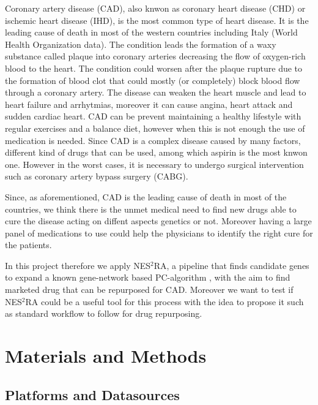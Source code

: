 \documentclass[fleqn,10pt]{SelfArx} %
\begin{document}
Coronary artery disease (CAD), also knwon as coronary heart disease (CHD) or ischemic heart disease (IHD), is the most common type of heart disease. It is the leading cause of death in most of the western countries including Italy (World Health Organization data). The condition leads the formation of a waxy substance called plaque into coronary arteries decreasing the flow of oxygen-rich blood to the heart. The condition could worsen after the plaque rupture due to the formation of blood clot that could mostly (or completely) block blood flow through a coronary artery. The disease can weaken the heart muscle and lead to heart failure and arrhytmias, moreover it can cause angina, heart attack and sudden cardiac heart.
CAD can be prevent maintaining a healthy lifestyle with regular exercises and a balance diet, however when this is not enough the use of medication is needed. Since CAD is a complex disease caused by many factors, different kind of drugs that can be used, among which aspirin is the most knwon one. 
However in the worst cases, it is necessary to undergo surgical intervention such as coronary artery bypass surgery (CABG).

Since, as aforementioned, CAD is the leading cause of death in most of the countries, we think there is the unmet medical need to find new drugs able to cure the disease acting on diffent aspects genetics or not. Moreover having a large panel of medications to use could help the physicians to identify the right cure for the patients.

In this project therefore we apply NES$^2$RA\cite{NES2RA}, a pipeline that finds candidate genes to expand a known gene-network based PC-algorithm \cite{PC-alg}, with the aim to find marketed drug that can be repurposed for CAD.
Moreover we want to test if NES$^2$RA could be a useful tool for this process with the idea to propose it such as standard workflow to follow for drug repurposing. 


\section*{Materials and Methods}

\subsection*{Platforms and Datasources}
\end{document}
